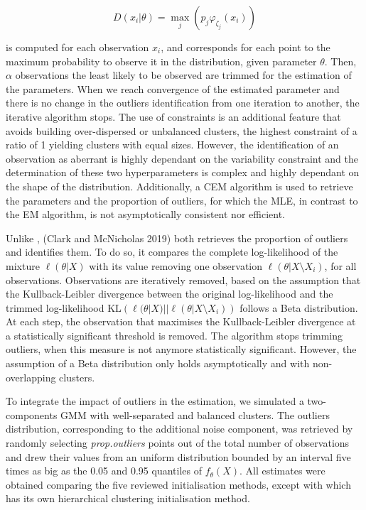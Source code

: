 \begin{equation}
    D(x_i|\theta)=\max_j \left(p_{j} \varphi_{\zeta_j} (x_i) \right)
\label{eq:affinity-degree}
\end{equation}

is computed for each observation \(x_i\), and corresponds for each point
to the maximum probability to observe it in the distribution, given
parameter \(\theta\). Then, \(\alpha\) observations the least likely to be
observed are trimmed for the estimation of the parameters. When we reach
convergence of the estimated parameter and there is no change in the
outliers identification from one iteration to another, the iterative
algorithm stops. The use of constraints is an additional feature that
avoids building over-dispersed or unbalanced clusters, the highest
constraint of a ratio of 1 yielding clusters with equal sizes. However,
the identification of an observation as aberrant is highly dependant on
the variability constraint and the determination of these two
hyperparameters is complex and highly dependant on the shape of the
distribution. Additionally, a CEM algorithm is used to retrieve the
parameters and the proportion of outliers, for which the MLE, in
contrast to the EM algorithm, is not asymptotically consistent nor
efficient.

Unlike ,  (Clark and McNicholas 2019) both retrieves the
proportion of outliers and identifies them. To do so, it compares the
complete log-likelihood of the mixture \(\ell(\theta|X)\) with its value
removing one observation \(\ell(\theta | X \setminus X_i)\), for all
observations. Observations are iteratively removed, based on the
assumption that the Kullback-Leibler divergence between the original
log-likelihood and the trimmed log-likelihood
\(\text{KL}\left(\ell(\theta|X)|| \ell(\theta | X \setminus X_i)\right)\)
follows a Beta distribution. At each step, the observation that
maximises the Kullback-Leibler divergence at a statistically significant
threshold is removed. The algorithm stops trimming outliers, when this
measure is not anymore statistically significant. However, the
assumption of a Beta distribution only holds asymptotically and with
non-overlapping clusters.

To integrate the impact of outliers in the estimation, we simulated a
two-components GMM with well-separated and balanced clusters. The
outliers distribution, corresponding to the additional noise component,
was retrieved by randomly selecting \emph{prop.outliers} points out of the
total number of observations and drew their values from an uniform
distribution bounded by an interval five times as big as the 0.05 and
0.95 quantiles of \(f_\theta(X)\). All estimates were obtained comparing
the five reviewed initialisation methods, except with 
which has its own hierarchical clustering initialisation method.

